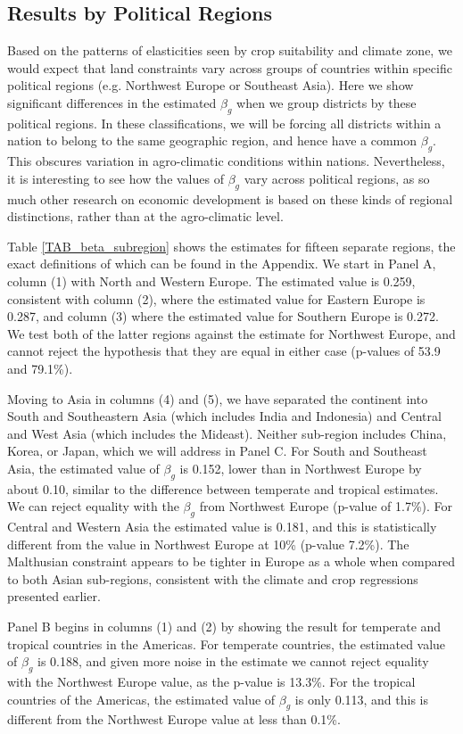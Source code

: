 \subsection{Results by Political Regions}
Based on the patterns of elasticities seen by crop suitability and climate zone, we would expect that land constraints vary across groups of countries within specific political regions (e.g. Northwest Europe or Southeast Asia). Here we show significant differences in the estimated $\beta_g$ when we group districts by these political regions. In these classifications, we will be forcing all districts within a nation to belong to the same geographic region, and hence have a common $\beta_g$. This obscures variation in agro-climatic conditions within nations. Nevertheless, it is interesting to see how the values of $\beta_g$ vary across political regions, as so much other research on economic development is based on these kinds of regional distinctions, rather than at the agro-climatic level.

Table \ref{TAB_beta_subregion} shows the estimates for fifteen separate regions, the exact definitions of which can be found in the Appendix. We start in Panel A, column (1) with North and Western Europe. The estimated value is 0.259, consistent with column (2), where the estimated value for Eastern Europe is 0.287, and column (3) where the estimated value for Southern Europe is 0.272. We test both of the latter regions against the estimate for Northwest Europe, and cannot reject the hypothesis that they are equal in either case (p-values of 53.9 and 79.1\%). 

Moving to Asia in columns (4) and (5), we have separated the continent into South and Southeastern Asia (which includes India and Indonesia) and Central and West Asia (which includes the Mideast). Neither sub-region includes China, Korea, or Japan, which we will address in Panel C. For South and Southeast Asia, the estimated value of $\beta_g$ is 0.152, lower than in Northwest Europe by about 0.10, similar to the difference between temperate and tropical estimates. We can reject equality with the $\beta_g$ from Northwest Europe (p-value of 1.7\%). For Central and Western Asia the estimated value is 0.181, and this is statistically different from the value in Northwest Europe at 10\% (p-value 7.2\%). The Malthusian constraint appears to be tighter in Europe as a whole when compared to both Asian sub-regions, consistent with the climate and crop regressions presented earlier.

Panel B begins in columns (1) and (2) by showing the result for temperate and tropical countries in the Americas. For temperate countries, the estimated value of $\beta_g$ is 0.188, and given more noise in the estimate we cannot reject equality with the Northwest Europe value, as the p-value is 13.3\%. For the tropical countries of the Americas, the estimated value of $\beta_g$ is only 0.113, and this is different from the Northwest Europe value at less than 0.1\%.

